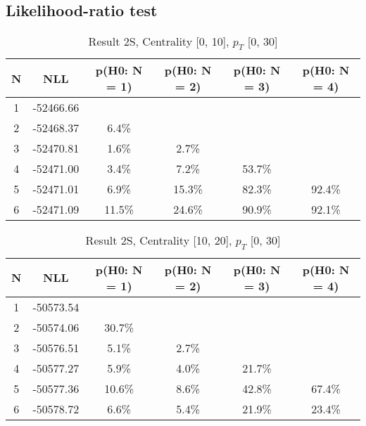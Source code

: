 \subsection{Likelihood-ratio test}
\begin{table}[htb]
	\begin{center}
	\caption{Result 2S, Centrality [0, 10], $p_{T}$ [0, 30]
}
{\footnotesize\renewcommand{\arraystretch}{1.4}
		\begin{tabular}{cc||cccc}
			N & NLL & p(H0: N = 1) & p(H0: N = 2) & p(H0: N = 3) & p(H0: N = 4)\\ 
		\hline
1 & -52466.66 & & & & \\
2 & -52468.37 & 6.4\% & & & \\
3 & -52470.81 & 1.6\% & 2.7\% & & \\
4 & -52471.00 & 3.4\% & 7.2\% & 53.7\% & \\
5 & -52471.01 & 6.9\% & 15.3\% & 82.3\% & 92.4\% \\
6 & -52471.09 & 11.5\% & 24.6\% & 90.9\% & 92.1\% \\
	\end{tabular}
		\label{tab:lab}
	}
	\end{center}\end{table}

\begin{table}[htb]
	\begin{center}
	\caption{Result 2S, Centrality [10, 20], $p_{T}$ [0, 30]
}
{\footnotesize\renewcommand{\arraystretch}{1.4}
		\begin{tabular}{cc||cccc}
			N & NLL & p(H0: N = 1) & p(H0: N = 2) & p(H0: N = 3) & p(H0: N = 4)\\ 
		\hline
1 & -50573.54 & & & & \\
2 & -50574.06 & 30.7\% & & & \\
3 & -50576.51 & 5.1\% & 2.7\% & & \\
4 & -50577.27 & 5.9\% & 4.0\% & 21.7\% & \\
5 & -50577.36 & 10.6\% & 8.6\% & 42.8\% & 67.4\% \\
6 & -50578.72 & 6.6\% & 5.4\% & 21.9\% & 23.4\% \\
	\end{tabular}
		\label{tab:lab}
	}
	\end{center}\end{table}

